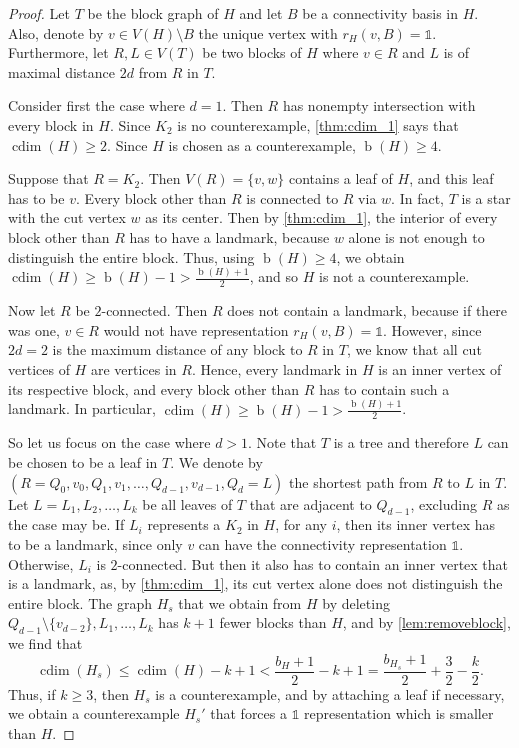 \documentclass[10pt,a4paper]{amsart}
\DeclareMathOperator{\blocks}{\text{$b$}}
\DeclareMathOperator{\cdim}{cdim}
\begin{document}
\begin{proof}
    Let $T$ be the block graph of $H$ and let $B$ be a connectivity basis in $H$.
    Also, denote by $v\in V(H)\setminus B$ the unique vertex with $r_H(v,B)=\mathds{1}$.
    Furthermore, let $R,L\in V(T)$ be two blocks of $H$ where $v\in R$ and $L$ is of maximal distance $2d$ from $R$ in $T$.
    
    Consider first the case where $d=1$.
    Then $R$ has nonempty intersection with every block in $H$.
    Since $K_2$ is no counterexample, \cref{thm:cdim_1} says that $\cdim(H)\geq2$.
    Since $H$ is chosen as a counterexample, $\blocks(H)\geq 4$.
    
    Suppose that $R=K_2$.
    Then $V(R)=\{v,w\}$ contains a leaf of $H$, and this leaf has to be $v$.
    Every block other than $R$ is connected to $R$ via $w$. 
    In fact, $T$ is a star with the cut vertex $w$ as its center.
    Then by \cref{thm:cdim_1}, the interior of every block other than $R$ has to have a landmark, because $w$ alone is not enough to distinguish the entire block. 
    Thus, using $\blocks(H)\geq4$, we obtain $\cdim(H)\geq\blocks(H)-1>\frac{\blocks(H)+1}{2}$, and so $H$ is not a counterexample.
    
    Now let $R$ be \mbox{$2$-connected}.
    Then $R$ does not contain a landmark, because if there was one, $v\in R$ would not have representation $r_H(v,B)=\mathds{1}$.
    However, since $2d=2$ is the maximum distance of any block to $R$ in $T$, we know that all cut vertices of $H$ are vertices in $R$. 
    Hence, every landmark in $H$ is an inner vertex of its respective block, and every block other than $R$ has to contain such a landmark.
    In particular, $\cdim(H)\geq\blocks(H)-1>\frac{\blocks(H)+1}{2}$.

    So let us focus on the case where $d>1$.
    Note that $T$ is a tree and therefore $L$ can be chosen to be a leaf in $T$. 
    We denote by $(R=Q_0,v_0,Q_1,v_1,\ldots,Q_{d-1},v_{d-1},Q_{d}=L)$ the shortest path from $R$ to $L$ in $T$.
    Let $L=L_1,L_2,\ldots,L_k$ be all leaves of $T$ that are adjacent to $Q_{d-1}$, excluding $R$ as the case may be.
    If $L_i$ represents a $K_2$ in $H$, for any $i$, then its inner vertex has to be a landmark, since only $v$ can have the connectivity representation $\mathds{1}$.
    Otherwise, $L_i$ is \mbox{$2$-connected}. 
    But then it also has to contain an inner vertex that is a landmark, as, by \cref{thm:cdim_1}, its cut vertex alone does not distinguish the entire block.
    The graph $H_s$ that we obtain from $H$ by deleting $Q_{d-1}\setminus\{v_{d-2}\},L_1,\ldots,L_k$ has $k+1$ fewer blocks than $H$, and by \cref{lem:removeblock}, we find that
    \begin{equation*}
        \cdim(H_s)\leq \cdim(H)-k+1<\frac{b_H+1}{2}-k+1=\frac{b_{H_s}+1}{2}+\frac{3}{2}-\frac{k}{2}.
    \end{equation*}
    Thus, if $k\geq3$, then $H_s$ is a counterexample, and by attaching a leaf if necessary, we obtain a counterexample $H_s'$ that forces a $\mathds{1}$ representation which is smaller than $H$.
    

\end{proof}
\end{document}
